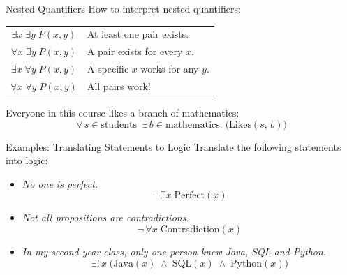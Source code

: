 \documentclass[aspectratio=169]{beamer}
\begin{document}
\begin{frame}{Nested Quantifiers}
  How to interpret nested quantifiers:

  \medskip
  \begin{center}
    \renewcommand{\arraystretch}{1.45}
    \begin{tabular}{|c|l|}
      \hline
      $\exists x\;\exists y\;P(x,y)$ & At least one pair exists. \\
      $\forall x\;\exists y\;P(x,y)$ & A pair exists for every $x$. \\
      $\exists x\;\forall y\;P(x,y)$ & A specific $x$ works for any $y$. \\
      $\forall x\;\forall y\;P(x,y)$ & All pairs work! \\
      \hline
    \end{tabular}
  \end{center}

  \medskip
  Everyone in this course likes a branch of mathematics:
  \[
    \forall\,s \in \mathrm{students}\;\;
    \exists\,b \in \mathrm{mathematics}\;\;
    \bigl(\mathrm{Likes}(s,\,b)\bigr)
  \]
\end{frame}

\begin{frame}{Examples: Translating Statements to Logic}
  Translate the following statements into logic:

  \medskip
  \begin{itemize}
    \item \emph{No one is perfect.}
    \[
      \neg\,\exists x\;\mathrm{Perfect}(x)
    \]

    \item \emph{Not all propositions are contradictions.}
    \[
      \neg\,\forall x\;\mathrm{Contradiction}(x)
    \]

    \item \emph{In my second-year class, only one person knew Java, SQL and Python.}
    \[
      \exists!\,x\;\bigl(\mathrm{Java}(x)\;\wedge\;\mathrm{SQL}(x)\;\wedge\;\mathrm{Python}(x)\bigr)
    \]
  \end{itemize}
\end{frame}
\end{document}
